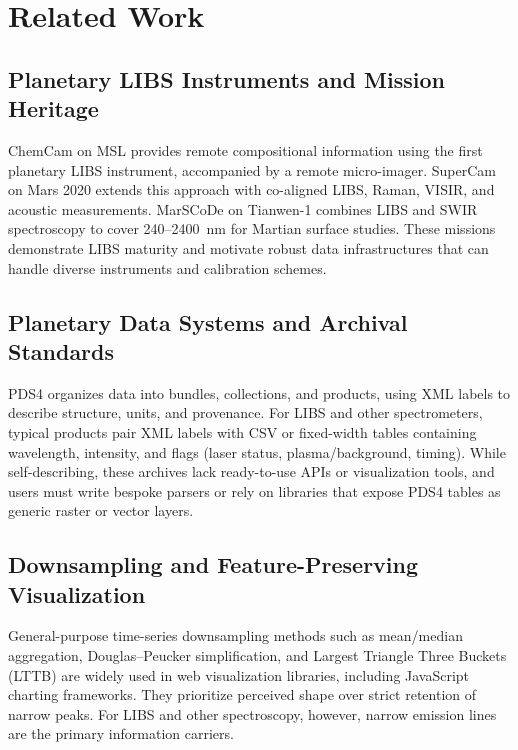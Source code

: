 \documentclass[12pt,a4paper]{article}
\begin{document}
\section{Related Work}
\label{sec:related}

\subsection{Planetary LIBS Instruments and Mission Heritage}

ChemCam on MSL provides remote compositional information using the first planetary LIBS instrument, accompanied by a remote micro-imager.\cite{Wiens2012,Maurice2012,Mangold2016} SuperCam on Mars 2020 extends this approach with co-aligned LIBS, Raman, VISIR, and acoustic measurements.\cite{Wiens2020,Bernardi2021} MarSCoDe on Tianwen-1 combines LIBS and SWIR spectroscopy to cover 240--2400~nm for Martian surface studies.\cite{Xu2021,MarSCoDe2024} These missions demonstrate LIBS maturity and motivate robust data infrastructures that can handle diverse instruments and calibration schemes.

\subsection{Planetary Data Systems and Archival Standards}

PDS4 organizes data into bundles, collections, and products, using XML labels to describe structure, units, and provenance.\cite{Hughes2018} For LIBS and other spectrometers, typical products pair XML labels with CSV or fixed-width tables containing wavelength, intensity, and flags (laser status, plasma/background, timing). While self-describing, these archives lack ready-to-use APIs or visualization tools, and users must write bespoke parsers or rely on libraries that expose PDS4 tables as generic raster or vector layers.\cite{GDALPDS4web}

\subsection{Downsampling and Feature-Preserving Visualization}

General-purpose time-series downsampling methods such as mean/median aggregation, Douglas--Peucker simplification, and Largest Triangle Three Buckets (LTTB) are widely used in web visualization libraries, including JavaScript charting frameworks.\cite{amChartsWeb} They prioritize perceived shape over strict retention of narrow peaks. For LIBS and other spectroscopy, however, narrow emission lines are the primary information carriers.
\end{document}
